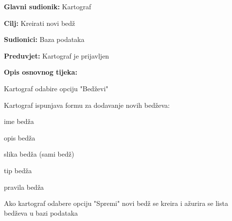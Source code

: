 					
					\noindent {}
					\begin{packed_item}
	
						\item \textbf{Glavni sudionik: }Kartograf
						\item  \textbf{Cilj:} Kreirati novi bedž
						\item  \textbf{Sudionici:} Baza podataka
						\item  \textbf{Preduvjet:} Kartograf je prijavljen
						\item  \textbf{Opis osnovnog tijeka:}
						
						\item[] \begin{packed_enum}
	
	                        \item Kartograf odabire opciju "Bedževi"
	                        \item Kartograf ispunjava formu za dodavanje novih bedževa:
	                        \begin{packed_item}
							    \item ime bedža
							    \item opis bedža
							    \item slika bedža (sami bedž)
							    \item tip bedža
							    \item pravila bedža
							\end{packed_item}
							\item Ako kartograf odabere opciju "Spremi" novi bedž se kreira i ažurira se lista bedževa u bazi podataka
	                        

						\end{packed_enum}
						
					\end{packed_item}
					
